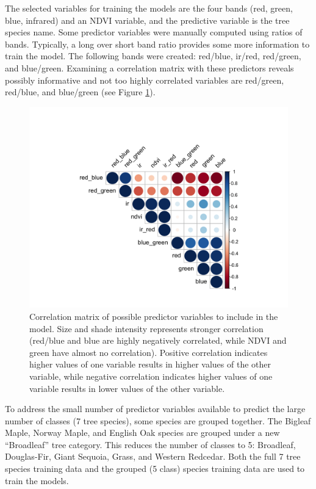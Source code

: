 \documentclass[12pt,twoside]{reedthesis}
\begin{document}
The selected variables for training the models are the four bands (red, green, blue, infrared) and an NDVI variable, and the predictive variable is the tree species name. Some predictor variables were manually computed using ratios of bands. Typically, a long over short band ratio provides some more information to train the model. The following bands were created: red/blue, ir/red, red/green, and blue/green. Examining a correlation matrix with these predictors reveals possibly informative and not too highly correlated variables are red/green, red/blue, and blue/green (see Figure \ref{fig:corrmatrix}).
\begin{figure}

{\centering \includegraphics[width=0.7\linewidth]{figure/corrmatrix} 

}

\caption{Correlation matrix of possible predictor variables to include in the model. Size and shade intensity represents stronger correlation (red/blue and blue are highly negatively correlated, while NDVI and green have almost no correlation). Positive correlation indicates higher values of one variable results in higher values of the other variable, while negative correlation indicates higher values of one variable results in lower values of the other variable.}\label{fig:corrmatrix}
\end{figure}
To address the small number of predictor variables available to predict the large number of classes (7 tree species), some species are grouped together. The Bigleaf Maple, Norway Maple, and English Oak species are grouped under a new ``Broadleaf'' tree category. This reduces the number of classes to 5: Broadleaf, Douglas-Fir, Giant Sequoia, Grass, and Western Redcedar. Both the full 7 tree species training data and the grouped (5 class) species training data are used to train the models.
\end{document}

